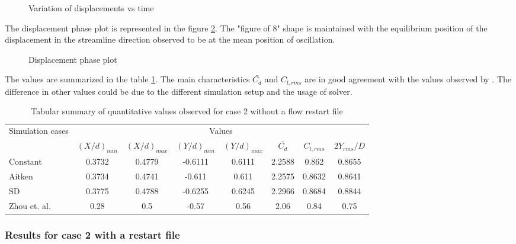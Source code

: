 \begin{figure}[H]
\centering
{}
\caption{Variation of displacements vs time}
\label{fig:4.16}
\end{figure}

The displacement phase plot is represented in the figure \ref{fig:4.17}. The "figure of 8" shape is maintained with the equilibrium position of the displacement in the streamline direction observed to be at the mean position of oscillation.

\begin{figure}[H]
\centering
{}
\caption{Displacement phase plot}
\label{fig:4.17}
\end{figure} 

The values are summarized in the table \ref{table:4.10}. The main characteristics $\bar{C_d}$ and $C_{l,rms}$ are in good agreement with the values observed by \citet{zhou1999vortex}. The difference in other values could be due to the different simulation setup and the usage of solver.

\begin{table}[htbp]
  \centering
   \begin{tabular}{|l|c|c|c|c|c|c|c|}
    \hline
    \multicolumn{1}{|c|}{\multirow{2}[4]{*}{Simulation cases}} & \multicolumn{7}{c|}{Values} \\
\cline{2-8}          & $(X/d)_{min}$ & $(X/d)_{max}$ & $(Y/d)_{min}$ & $(Y/d)_{max}$ & $\bar{C_d}$  & $C_{l,rms}$ & $2Y_{rms}/D$ \\
    \hline
    Constant & 0.3732 & 0.4779 & -0.6111 & 0.6111 & 2.2588 & 0.862 & 0.8655 \\
    \hline
    Aitken & 0.3734 & 0.4741 & -0.611 & 0.611 & 2.2575 & 0.8632 & 0.8641 \\
    \hline
    SD    & 0.3775 & 0.4788 & -0.6255 & 0.6245 & 2.2966 & 0.8684 & 0.8844 \\
    \hline
    Zhou et. al. & 0.28 & 0.5 & -0.57 & 0.56 & 2.06 & 0.84 & 0.75 \\
    \hline
    \end{tabular}%
    \caption{Tabular summary of quantitative values observed for case 2 without a flow restart file}
  \label{table:4.10}%
\end{table}%

\subsubsection{Results for case 2 with a restart file}


